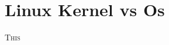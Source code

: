 \sectionend

\section{Linux Kernel vs Os}
\label{sec:linux_kernel_vs_os}

\lettrine[lines=3, findent=3pt, nindent=0pt]{T}{his} 

\sectionend




~\cite{wiki_filesystem}\cite{likegeeks_filesystem}\cite{linux_filesystem}\cite{wiki_posix}\cite{linuxtopia} 




